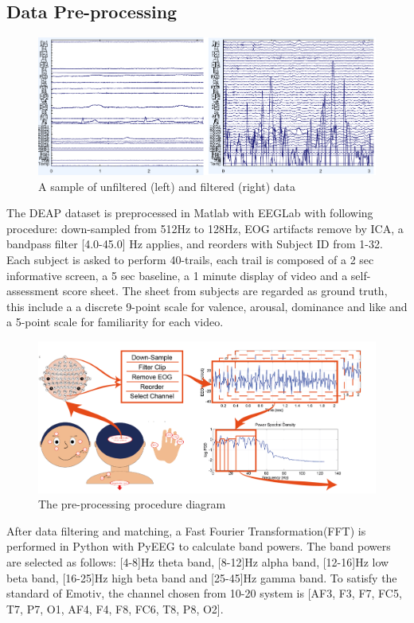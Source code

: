 \documentclass[a4paper]{article}
\begin{document}
\subsection{Data Pre-processing}

\begin{figure}
	\centering
	\includegraphics[width=0.8\linewidth]{Deap_Preprocess}
	\caption{A sample of unfiltered (left) and filtered (right) data}
	\label{fig:filter}
\end{figure}

The DEAP dataset\autocite{koelstra2012deap} is preprocessed in Matlab with EEGLab with following procedure: down-sampled from 512Hz to 128Hz, EOG artifacts remove by ICA, a bandpass filter [4.0-45.0] Hz applies, and reorders with Subject ID from 1-32. Each subject is asked to perform 40-trails, each trail is composed of a 2 sec informative screen, a 5 sec baseline, a 1 minute display of video and a self-assessment score sheet. The sheet from subjects are regarded as ground truth, this include a a discrete 9-point scale for valence, arousal, dominance and like and a 5-point scale for familiarity for each video. 

\begin{figure}
	\centering
	\includegraphics[width=\linewidth]{Diagram_FFT}
	\caption{The pre-processing procedure diagram}
	\label{fig:FFT}
\end{figure}

After data filtering and matching, a Fast Fourier Transformation(FFT) is performed in Python with PyEEG to calculate band powers. The band powers are selected as follows: [4-8]Hz theta band, [8-12]Hz alpha band, [12-16]Hz low beta band, [16-25]Hz high beta band and [25-45]Hz gamma band. To satisfy the standard of Emotiv, the channel chosen from 10-20 system is [AF3, F3, F7, FC5, T7, P7, O1, AF4, F4, F8, FC6, T8, P8, O2].
\end{document}
